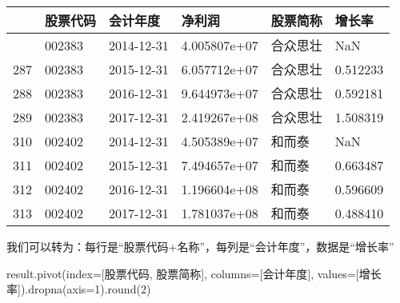 \documentclass[
  letterpaper,
  DIV=11,
  numbers=noendperiod]{scrreprt}
\newenvironment{Shaded}{\begin{snugshade}}{\end{snugshade}}
\newcommand{\BuiltInTok}[1]{\textcolor[rgb]{0.00,0.23,0.31}{#1}}
\newcommand{\DecValTok}[1]{\textcolor[rgb]{0.68,0.00,0.00}{#1}}
\newcommand{\NormalTok}[1]{\textcolor[rgb]{0.00,0.23,0.31}{#1}}
\newcommand{\OperatorTok}[1]{\textcolor[rgb]{0.37,0.37,0.37}{#1}}
\newcommand{\StringTok}[1]{\textcolor[rgb]{0.13,0.47,0.30}{#1}}
\begin{document}
\begin{longtable}[]{@{}llllll@{}}
\toprule\noalign{}
& 股票代码 & 会计年度 & 净利润 & 股票简称 & 增长率 \\
\midrule\noalign{}
\endhead
\bottomrule\noalign{}
\endlastfoot
286 & 002383 & 2014-12-31 & 4.005807e+07 & 合众思壮 & NaN \\
287 & 002383 & 2015-12-31 & 6.057712e+07 & 合众思壮 & 0.512233 \\
288 & 002383 & 2016-12-31 & 9.644973e+07 & 合众思壮 & 0.592181 \\
289 & 002383 & 2017-12-31 & 2.419267e+08 & 合众思壮 & 1.508319 \\
310 & 002402 & 2014-12-31 & 4.505389e+07 & 和而泰 & NaN \\
311 & 002402 & 2015-12-31 & 7.494657e+07 & 和而泰 & 0.663487 \\
312 & 002402 & 2016-12-31 & 1.196604e+08 & 和而泰 & 0.596609 \\
313 & 002402 & 2017-12-31 & 1.781037e+08 & 和而泰 & 0.488410 \\
\end{longtable}

我们可以转为：每行是``股票代码+名称''，每列是``会计年度''，数据是``增长率''

\begin{Shaded}
\begin{Highlighting}[]
\NormalTok{result.pivot(index}\OperatorTok{=}\NormalTok{[}\StringTok{\textquotesingle{}股票代码\textquotesingle{}}\NormalTok{, }\StringTok{\textquotesingle{}股票简称\textquotesingle{}}\NormalTok{], columns}\OperatorTok{=}\NormalTok{[}\StringTok{\textquotesingle{}会计年度\textquotesingle{}}\NormalTok{],}
\NormalTok{             values}\OperatorTok{=}\NormalTok{[}\StringTok{\textquotesingle{}增长率\textquotesingle{}}\NormalTok{]).dropna(axis}\OperatorTok{=}\DecValTok{1}\NormalTok{).}\BuiltInTok{round}\NormalTok{(}\DecValTok{2}\NormalTok{)}
\end{Highlighting}
\end{Shaded}
\end{document}
